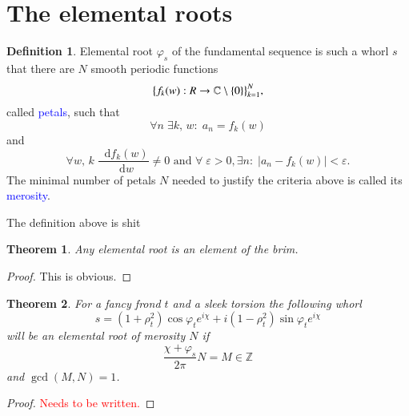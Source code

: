 \documentclass{article}
\newcommand*\df {\mathop{}\!\mathrm{d}}
\newcommand{\red}[1]{\textcolor{red}{#1}}
\newcommand{\blue}[1]{\textcolor{blue}{#1}}
\theoremstyle{plain}
\newtheorem{theorem}{Theorem}[section]
\theoremstyle{definition}
\newtheorem{definition}{Definition}[section]
\newcommand{\cmz}{\mathbb C \setminus \{0\} }
\begin{document}
\section{The elemental roots}
    \begin{definition}
        Elemental root $\varphi_s$ of the fundamental sequence is such a whorl $s$ that there are $N$ smooth periodic functions 
        $$ 
            \big\{f_k(w): \mathbb \mathbb R \rightarrow \cmz\big\}_{k=1}^N 
        ,$$ called \blue{petals}, such that $$
            \forall n %
            \; \exists k %
            ,\,w %
            :\; a_n = f_k(w) 
        $$ and $$
            \forall w,\,k\; \frac{\df{f_k(w)}}{\df{w}}\ne 0 \text{ and } \forall \;\varepsilon >0, \exists n :\; |a_n - f_k(w)|<\varepsilon
        .$$
        The minimal number of petals $N$ needed to justify the criteria above is called its \blue{merosity}.  	
    \end{definition} 
    The definition above is shit
    \begin{theorem}
        Any elemental root is an element of the brim.
    \end{theorem}
    \begin{proof}
        This is obvious.
    \end{proof}

    \begin{theorem}
        For a fancy frond $t$ and a sleek torsion
        the following whorl
        $$
            s = (1+\rho_t^2)\cos\varphi_t e^{i\chi} + i(1-\rho_t^2)\sin\varphi_t e^{i\chi}
        $$ will be an elemental root of merosity $N$ if $$
            \frac{\chi+\varphi_s}{2\pi}N= M\in \mathbb Z
        $$ and $  \gcd(M,N)=1$.
    \end{theorem}
    \begin{proof}
        \red{Needs to be written.}
    \end{proof}
\end{document}
